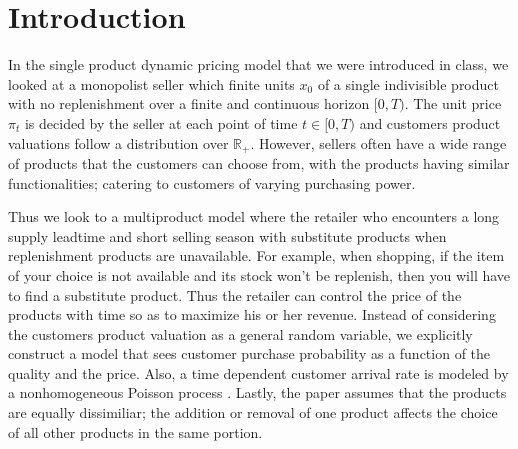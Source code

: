 


\section{Introduction}

In the single product dynamic pricing model that we were introduced in class, we looked at a monopolist seller which finite units $x_0$ of a single indivisible product with no replenishment over a finite and continuous horizon $[0,T)$. The unit price $\pi_t$ is decided by the seller at each point of time $t \in [0,T)$ and customers product valuations follow a distribution over $\mathbb{R}_+$. However, sellers often have a wide range of products that the customers can choose from, with the products having similar functionalities; catering to customers of varying purchasing power. 

Thus we look to a multiproduct model \cite{Li2009} where the retailer who encounters a long supply leadtime and short selling season with substitute products when replenishment products are unavailable. For example, when shopping, if the item of your choice is not available and its stock won't be replenish, then you will have to find a substitute product. Thus the retailer can control the price of the products with time so as to maximize his or her revenue. Instead of considering the customers product valuation as a general random variable, we explicitly construct a model that sees customer purchase probability as a function of the quality and the price. Also, a time dependent customer arrival rate is modeled by a nonhomogeneous Poisson process . Lastly, the paper assumes that the products are equally dissimiliar; the addition or removal of one product affects the choice of all other products in the same portion.







